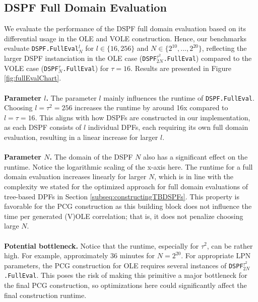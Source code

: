 \subsection{DSPF Full Domain Evaluation}
\label{subsec:evalDspfFullDomain}
We evaluate the performance of the DSPF full domain evaluation based on its differential usage in the OLE and VOLE construction. Hence, our benchmarks evaluate \texttt{DSPF.FullEval}$_N^l$ for $l\in\{16,256\}$ and $N\in\{2^{10}, ..., 2^{20}\}$, reflecting the larger DSPF instanciation in the OLE case (\texttt{DSPF}$^{\tau^2}_{2N}$\texttt{.FullEval}) compared to the VOLE case (\texttt{DSPF}$^{\tau}_{N}$\texttt{.FullEval}) for $\tau=16$. Results are presented in Figure \ref{fig:fullEvalChart}.
\\\\
\textbf{Parameter $l$.} The parameter $l$ mainly influences the runtime of \texttt{DSPF.FullEval}. Choosing $l=\tau^2=256$ increases the runtime by around 16x compared to $l=\tau=16$. This aligns with how DSPFs are constructed in our implementation, as each DSPF consists of $l$ individual DPFs, each requiring its own full domain evaluation, resulting in a linear increase for larger $l$.
\\\\
\textbf{Parameter $N$.} The domain of the DSPF $N$ also has a significant effect on the runtime. Notice the logarithmic scaling of the x-axis here. The runtime for a full domain evaluation increases linearly for larger $N$, which is in line with the complexity we stated for the optimized approach for full domain evaluations of tree-based DPFs in Section \ref{subseq:constructingTBDSPFs}. This property is favorable for the PCG construction as this building block does not influence the time per generated (V)OLE correlation; that is, it does not penalize choosing large $N$.
\\\\
\textbf{Potential bottleneck.} Notice that the runtime, especially for $\tau^2$, can be rather high. For example, approximately 36 minutes for $N=2^{20}$. For appropriate LPN parameters, the PCG construction for OLE requires several instances of \texttt{DSPF}$^{\tau^2}_{2N}$\texttt{.FullEval}. This poses the risk of making this primitive a major bottleneck for the final PCG construction, so optimizations here could significantly affect the final construction runtime.
\\\\
